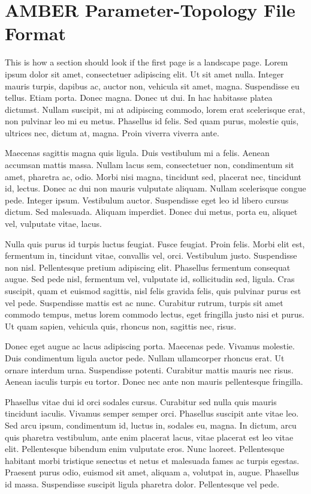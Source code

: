 \chapter{AMBER Parameter-Topology File Format}%
\label{appendixB}

This is how a section should look if the first page is a landscape page.
Lorem ipsum dolor sit amet, consectetuer adipiscing elit. Ut sit
amet nulla. Integer mauris turpis, dapibus ac, auctor non, vehicula
sit amet, magna. Suspendisse eu tellus. Etiam porta. Donec magna.
Donec ut dui. In hac habitasse platea dictumst. Nullam suscipit, mi
at adipiscing commodo, lorem erat scelerisque erat, non pulvinar leo
mi eu metus. Phasellus id felis. Sed quam purus, molestie quis,
ultrices nec, dictum at, magna. Proin viverra viverra ante.

Maecenas sagittis magna quis ligula. Duis vestibulum mi a felis.
Aenean accumsan mattis massa. Nullam lacus sem, consectetuer non,
condimentum sit amet, pharetra ac, odio. Morbi nisi magna, tincidunt
sed, placerat nec, tincidunt id, lectus. Donec ac dui non mauris
vulputate aliquam. Nullam scelerisque congue pede. Integer ipsum.
Vestibulum auctor. Suspendisse eget leo id libero cursus dictum. Sed
malesuada. Aliquam imperdiet. Donec dui metus, porta eu, aliquet
vel, vulputate vitae, lacus.

Nulla quis purus id turpis luctus feugiat. Fusce feugiat. Proin
felis. Morbi elit est, fermentum in, tincidunt vitae, convallis vel,
orci. Vestibulum justo. Suspendisse non nisl. Pellentesque pretium
adipiscing elit. Phasellus fermentum consequat augue. Sed pede nisl,
fermentum vel, vulputate id, sollicitudin sed, ligula. Cras
suscipit, quam et euismod sagittis, nisl felis gravida felis, quis
pulvinar purus est vel pede. Suspendisse mattis est ac nunc.
Curabitur rutrum, turpis sit amet commodo tempus, metus lorem
commodo lectus, eget fringilla justo nisi et purus. Ut quam sapien,
vehicula quis, rhoncus non, sagittis nec, risus.

Donec eget augue ac lacus adipiscing porta. Maecenas pede. Vivamus
molestie. Duis condimentum ligula auctor pede. Nullam ullamcorper
rhoncus erat. Ut ornare interdum urna. Suspendisse potenti.
Curabitur mattis mauris nec risus. Aenean iaculis turpis eu tortor.
Donec nec ante non mauris pellentesque fringilla.

Phasellus vitae dui id orci sodales cursus. Curabitur sed nulla quis
mauris tincidunt iaculis. Vivamus semper semper orci. Phasellus
suscipit ante vitae leo. Sed arcu ipsum, condimentum id, luctus in,
sodales eu, magna. In dictum, arcu quis pharetra vestibulum, ante
enim placerat lacus, vitae placerat est leo vitae elit. Pellentesque
bibendum enim vulputate eros. Nunc laoreet. Pellentesque habitant
morbi tristique senectus et netus et malesuada fames ac turpis
egestas. Praesent purus odio, euismod sit amet, aliquam a, volutpat
in, augue. Phasellus id massa. Suspendisse suscipit ligula pharetra
dolor. Pellentesque vel pede.

